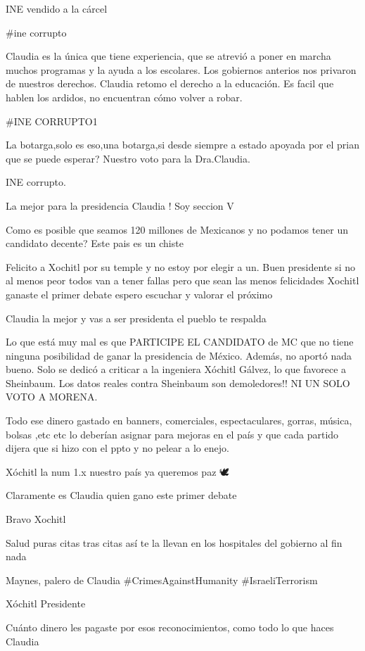 INE vendido a la cárcel

#ine corrupto

Claudia es la única que tiene experiencia, que se atrevió a poner en marcha muchos programas y la ayuda a los escolares.
Los gobiernos anterios nos privaron de nuestros derechos.
Claudia retomo el derecho a la educación.
Es facil que hablen los ardidos, no encuentran cómo volver a robar.

#INE CORRUPTO1

La botarga,solo es eso,una botarga,si desde siempre a estado apoyada por el prian que se puede esperar?  Nuestro voto para la Dra.Claudia.

INE corrupto.

La mejor para la presidencia Claudia ! Soy seccion V

Como es posible que seamos 120 millones de Mexicanos y no podamos tener un candidato decente? Este pais es un chiste

Felicito a Xochitl por su temple y no estoy por elegir a un. Buen presidente si no al menos peor todos van a tener fallas pero que sean las menos felicidades Xochitl ganaste el primer debate espero escuchar y valorar el próximo

Claudia la mejor y vas a ser presidenta el pueblo te respalda

Lo que está muy mal es que PARTICIPE EL CANDIDATO de MC que no tiene ninguna posibilidad de ganar la presidencia de México. Además, no aportó nada bueno. Solo se dedicó a criticar a la ingeniera Xóchitl Gálvez, lo que favorece a Sheinbaum.
Los datos reales contra Sheinbaum son demoledores!!
NI UN SOLO VOTO A MORENA.

Todo ese dinero gastado en banners, comerciales, espectaculares, gorras, música, bolsas ,etc etc lo deberían asignar para mejoras en el país y que cada partido dijera que si hizo con el ppto y no pelear a lo enejo.

Xóchitl la num 1.x nuestro país ya queremos paz 🕊️

Claramente es Claudia quien gano este primer debate

Bravo Xochitl

Salud puras citas tras citas así te la llevan  en los hospitales del gobierno al fin nada

Maynes, palero de Claudia #CrimesAgainstHumanity #IsraeliTerrorism

Xóchitl Presidente

Cuánto dinero les pagaste por esos reconocimientos, como todo lo que haces Claudia

